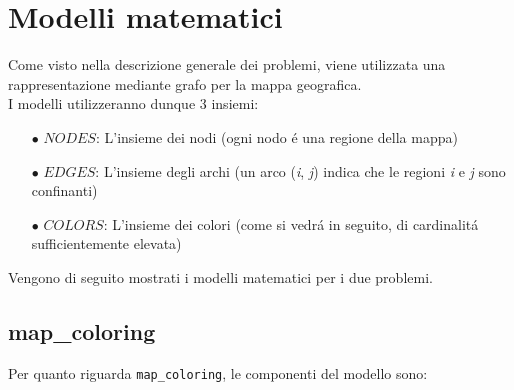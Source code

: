 \documentclass{article}
\begin{document}
\section{Modelli matematici}
Come visto nella descrizione generale dei problemi, viene utilizzata una rappresentazione mediante grafo per la mappa geografica.\\
I modelli utilizzeranno dunque 3 insiemi:
\begin{itemize}
	\item[$\bullet$] $NODES$: L'insieme dei nodi (ogni nodo \'e una regione della mappa)\\
	\item[$\bullet$] $EDGES$: L'insieme degli archi (un arco (\emph{i}, \emph{j}) indica che le regioni \emph{i} e \emph{j} sono confinanti)\\
	\item[$\bullet$] $COLORS$: L'insieme dei colori (come si vedr\'a in seguito, di cardinalit\'a sufficientemente elevata)\\
	\end{itemize}
	
Vengono di seguito mostrati i modelli matematici per i due problemi.\\

\subsection{map\_coloring}
Per quanto riguarda \texttt{map\_coloring}, le componenti del modello sono:\\
\end{document}
